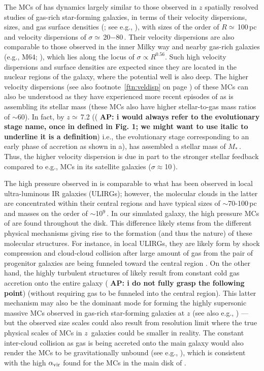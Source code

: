 \IfFileExists{emulateapjlegacy.cls}{\documentclass[iop]{emulateapjlegacy}}{\documentclass[iop]{emulateapj}}
\newcommand{\AP}[1]{({\bf \color{apcolor} AP: #1})}
\begin{document}
The MCs of \flower has dynamics largely similar to those observed in $z$ spatially resolved studies of gas-rich star-forming galaxies, in terms of their velocity dispersions, sizes, and gas surface densities (; see e.g., \citealt{Swinbank11a}), with sizes of the order of $R\simeq$\,100\,pc and velocity dispersions of $\sigma\simeq$\,20$-$80\,\kms.
%
%
Their velocity dispersions are also comparable to those observed in the inner Milky way and nearby gas-rich galaxies (e.g., M64; \citealt{Oka01a, Rosolowsky05a, Heyer09a}), which lies along the locus of $\sigma\propto R^{0.56}$. Such high velocity dispersions and surface densities are expected since they are located in the nuclear regions of the galaxy, where the potential well is also deep. The higher velocity dispersions (see also footnote~\ref{ftn:veldisp} on page \pageref{ftn:veldisp}) of these MCs can also be understood as they have experienced more recent episodes of \SF as \flower is assembling its stellar mass (these MCs also have higher stellar-to-gas mass ratios of $\sim$60).
%
In fact, by $z\simeq$\,7.2 (\AP{i would always refer to the evolutionary stage name, once in defined in Fig. 1; we might want to use italic to underline it is a definition} i.e., the evolutionary stage corresponding to an early phase of accretion as shown in a), \flower has assembled a stellar mass of $M_*$\,\Msun. Thus, the higher velocity dispersion is due in part to the stronger stellar feedback compared to e.g., MCs in its satellite galaxies ($\sigma\approx$10\,\kms).

The high pressure observed in \flower is comparable to what has been observed in local ultra-luminous IR galaxies (ULIRGs); however, the molecular clouds in the latter are concentrated within their central regions and have typical sizes of $\sim$70-100\,pc and masses on the order of $\sim$10$^9$\,\Msun \citep{Downes98a, Sakamoto08a}. In our simulated galaxy, the high pressure MCs of \flower are found throughout the disk. This difference likely stems from the different physical mechanisms giving rise to the formation (and thus the nature) of these molecular structures.
%
For instance, in local ULIRGs, they are likely form by shock compression and cloud-cloud collision after large amount of gas from the pair of progenitor galaxies are being funneled toward the central region \citep{Tan00a, Wu18a}.
On the other hand, the highly turbulent structures of \flower likely result from constant cold gas accretion onto the entire galaxy \AP{i do not fully grasp the following point} (without requiring gas to be funneled into the central region).
This latter mechanism may also be the dominant mode for forming the highly supersonic massive MCs observed in gas-rich star-forming galaxies at $z$ (see also e.g., \citealt{Swinbank11a}) --- but the observed size scales could also result from resolution limit where the true physical scales of MCs in $z$\, galaxies could be smaller in reality.
%
The constant inter-cloud collision as gas is being accreted onto the main galaxy would also render
the MCs to be gravitationally unbound (see e.g., \citealt{Dobbs11a}), which is 
consistent with the high $\alpha_{\rm vir}$ found for the MCs in the main disk of \flower.
\end{document}

